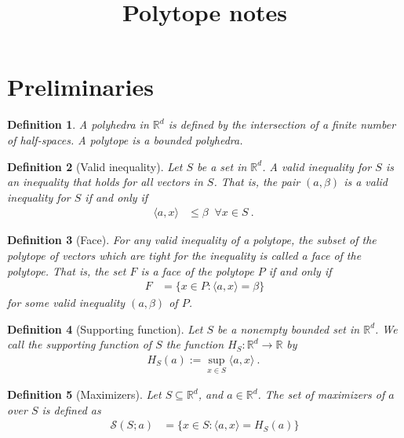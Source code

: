 \documentclass[12pt]{article}
\title{Polytope notes}
\date{}
\newcommand{\reals}{\mathbb{R}}
\newcommand{\inprod}[2]{\langle #1, #2 \rangle}%
\newtheorem{definition}{Definition}
\begin{document}
\maketitle

\section{Preliminaries}
\begin{definition}
	A \emph{polyhedra} in $\reals^d$ is defined by the intersection of a finite number of half-spaces.
	A \emph{polytope} is a bounded polyhedra.
\end{definition}

\begin{definition}[Valid inequality]
	Let $S$ be a set in $\reals^d$.
	A \emph{valid inequality} for $S$ is an inequality that holds for all vectors in $S$.
	That is, the pair $(a,\beta)$ is a valid inequality for $S$ if and only if 
	\begin{align*}
	\inprod{a}{x} &\leq \beta \; \; \forall x \in S~.~
	\end{align*}
\end{definition}

\begin{definition}[Face]
	For any valid inequality of a polytope, the subset of the polytope of vectors which are tight for the inequality is called a \emph{face} of the polytope.
	That is, the set $F$ is a face of the polytope $P$ if and only if 
	\begin{align*}
	F &= \{x \in P : \inprod{a}{x} = \beta \}
	\end{align*}
	for some valid inequality $(a, \beta)$ of $P$.
\end{definition}

\begin{definition}[Supporting function]
	Let $S$ be a nonempty bounded set in $\reals^d$.
	We call the \emph{supporting function} of $S$ the function $H_S:\reals^d \to \reals$ by
	\begin{align*}
	H_S(a) := \sup_{x \in S}\inprod{a}{x}~.~
	\end{align*} 
\end{definition}

\begin{definition}[Maximizers]
  Let $S \subseteq \reals^d$, and $a \in \reals^d$.
  The \emph{set of maximizers} of $a$ over $S$ is defined as
  \begin{align*}
    \mathcal{S}(S;a) &= \{x \in S : \inprod a x = H_S(a)\}
  \end{align*}
\end{definition}
\end{document}
